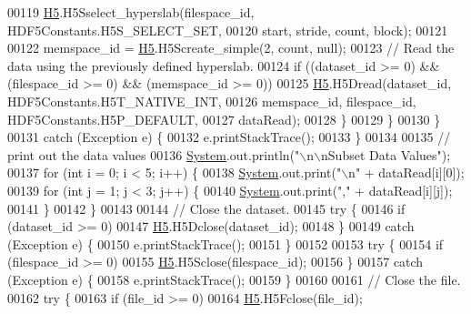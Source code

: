 \begin{DoxyCode}
00119                     \hyperlink{namespace_h5}{H5}.H5Sselect\_hyperslab(filespace\_id, HDF5Constants.H5S\_SELECT\_SET,
00120                             start, stride, count, block);
00121 
00122                     memspace\_id = \hyperlink{namespace_h5}{H5}.H5Screate\_simple(2, count, null);
00123                     \textcolor{comment}{// Read the data using the previously defined hyperslab.}
00124                     \textcolor{keywordflow}{if} ((dataset\_id >= 0) && (filespace\_id >= 0) && (memspace\_id >= 0))
00125                         \hyperlink{namespace_h5}{H5}.H5Dread(dataset\_id, HDF5Constants.H5T\_NATIVE\_INT,
00126                                 memspace\_id, filespace\_id, HDF5Constants.H5P\_DEFAULT,
00127                                 dataRead);
00128                 \}
00129             \}
00130         \}
00131         \textcolor{keywordflow}{catch} (Exception e) \{
00132             e.printStackTrace();
00133         \}
00134 
00135         \textcolor{comment}{// print out the data values}
00136         \hyperlink{namespace_system}{System}.out.println(\textcolor{stringliteral}{"\(\backslash\)n\(\backslash\)nSubset Data Values"});
00137         \textcolor{keywordflow}{for} (\textcolor{keywordtype}{int} i = 0; i < 5; i++) \{
00138             \hyperlink{namespace_system}{System}.out.print(\textcolor{stringliteral}{"\(\backslash\)n"} + dataRead[i][0]);
00139             \textcolor{keywordflow}{for} (\textcolor{keywordtype}{int} j = 1; j < 3; j++) \{
00140                 \hyperlink{namespace_system}{System}.out.print(\textcolor{stringliteral}{","} + dataRead[i][j]);
00141             \}
00142         \}
00143 
00144         \textcolor{comment}{// Close the dataset.}
00145         \textcolor{keywordflow}{try} \{
00146             \textcolor{keywordflow}{if} (dataset\_id >= 0)
00147                 \hyperlink{namespace_h5}{H5}.H5Dclose(dataset\_id);
00148         \}
00149         \textcolor{keywordflow}{catch} (Exception e) \{
00150             e.printStackTrace();
00151         \}
00152 
00153         \textcolor{keywordflow}{try} \{
00154             \textcolor{keywordflow}{if} (filespace\_id >= 0)
00155                 \hyperlink{namespace_h5}{H5}.H5Sclose(filespace\_id);
00156         \}
00157         \textcolor{keywordflow}{catch} (Exception e) \{
00158             e.printStackTrace();
00159         \}
00160 
00161         \textcolor{comment}{// Close the file.}
00162         \textcolor{keywordflow}{try} \{
00163             \textcolor{keywordflow}{if} (file\_id >= 0)
00164                 \hyperlink{namespace_h5}{H5}.H5Fclose(file\_id);

\end{DoxyCode}
